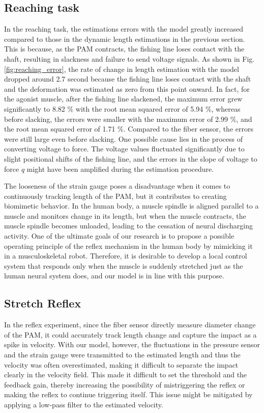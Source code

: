\subsection{Reaching task}
In the reaching task, the estimations errors with the model greatly increased compared to those in the dynamic length estimations in the previous section. This is because, as the PAM contracts, the fishing line loses contact with the shaft, resulting in slackness and failure to send voltage signals. As shown in Fig.\ref{fig:reaching_error}, the rate of change in length estimation with the model dropped around 2.7 second because the fishing line loses contact with the shaft and the deformation was estimated as zero from this point onward. In fact, for the agonist muscle, after the fishing line slackened, the maximum error grew significantly to 8.82 $\%$ with the root mean squared error of 5.94 $\%$, whereas before slacking, the errors were smaller with the maximum error of 2.99 $\%$, and the root mean squared error of 1.71 $\%$. Compared to the fiber sensor, the errors were still large even before slacking. One possible cause lies in the process of converting voltage to force. The voltage values fluctuated significantly due to slight positional shifts of the fishing line, and the errors in the slope of voltage to force $q$ might have been amplified during the estimation procedure.

The looseness of the strain gauge poses a disadvantage when it comes to continuously tracking length of the PAM, but it contributes to creating biomimetic behavior. In the human body, a muscle spindle is aligned parallel to a muscle and monitors change in its length, but when the muscle contracts, the muscle spindle becomes unloaded, leading to the cessation of neural discharging activity\cite{spindle}. One of the ultimate goals of our research is to propose a possible operating principle of the reflex mechanism in the human body by mimicking it in a musculoskeletal robot. Therefore, it is desirable to develop a local control system that responds only when the muscle is suddenly stretched just as the human neural system does, and our model is in line with this purpose.

\subsection{Stretch Reflex}
In the reflex experiment, since the fiber sensor directly measure diameter change of the PAM, it could accurately track length change and capture the impact as a spike in velocity. With our model, however, the fluctuations in the pressure sensor and the strain gauge were transmitted to the estimated length and thus the velocity was often overestimated, making it difficult to separate the impact clearly in the velocity field. This made it difficult to set the threshold and the feedback gain, thereby increasing the possibility of mistriggering the reflex or making the reflex to continue triggering itself. This issue might be mitigated by applying a low-pass filter to the estimated velocity.


